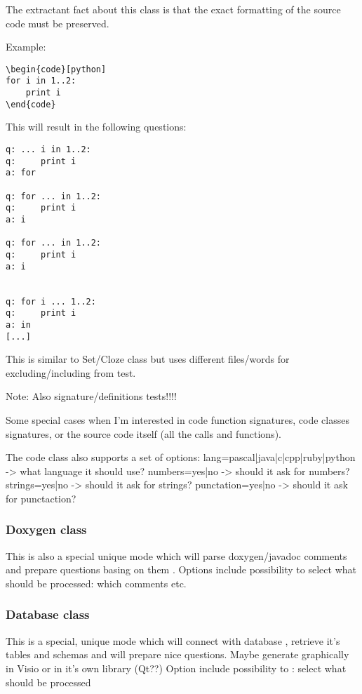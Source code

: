 \documentclass[a4paper,11pt]{article}
\begin{document}
The extractant fact about this class is that the exact formatting of the source
code must be preserved.

Example:
\begin{verbatim}
\begin{code}[python]
for i in 1..2:
    print i
\end{code}
\end{verbatim}

This will result in the following questions:
\begin{verbatim}
q: ... i in 1..2:
q:     print i
a: for

q: for ... in 1..2:
q:     print i
a: i

q: for ... in 1..2:
q:     print i
a: i


q: for i ... 1..2:
q:     print i
a: in
[...]
\end{verbatim}

This is similar to Set/Cloze class but uses different files/words for
excluding/including from test.

Note:
Also signature/definitions tests!!!!

Some special cases when I'm interested in code function signatures, code
classes signatures, or the source code itself (all the calls and functions).

The code class also supports a set of options:
lang=pascal|java|c|cpp|ruby|python -> what language it should use?
numbers=yes|no -> should it ask for numbers?
strings=yes|no -> should it ask for strings?
punctation=yes|no -> should it ask for punctaction?




\subsubsection{Doxygen class}
This is also a special unique mode which will parse doxygen/javadoc
comments and prepare questions basing on them .
Options include possibility to select what should be processed:
which comments etc.

\subsubsection{Database class}
This is a special, unique mode which will connect with database , retrieve it's
tables and schemas and will prepare nice questions.
Maybe generate graphically in Visio or in it's own library (Qt??)
Option include possibility to :
select what should be processed
\end{document}
